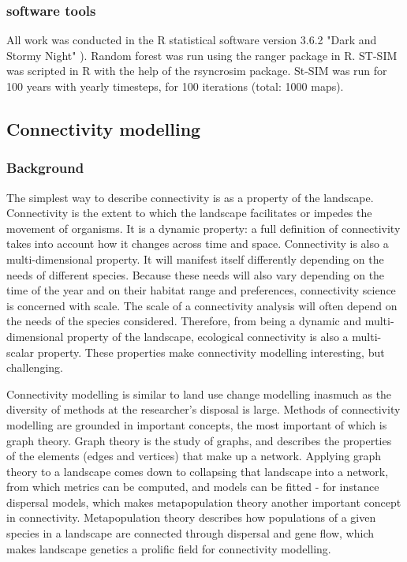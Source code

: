 \subsubsection{software tools}
All work was conducted in the R statistical software version 3.6.2 "Dark and Stormy Night" \citep[see][]{R}). Random forest was run using the ranger package in R. ST-SIM was scripted in R with the help of the rsyncrosim package. St-SIM was run for 100 years with yearly timesteps, for 100 iterations (total: 1000 maps).\\

\subsection{Connectivity modelling}

\subsubsection{Background}
The simplest way to describe connectivity is as a property of the landscape. Connectivity is the extent to which the landscape facilitates or impedes the movement of organisms. It is a dynamic property: a full definition of connectivity takes into account how it changes across time and space. Connectivity is also a multi-dimensional property. It will manifest itself differently depending on the needs of different species. Because these needs will also vary depending on the time of the year and on their habitat range and preferences, connectivity science is concerned with scale. The scale of a connectivity analysis will often depend on the needs of the species considered. Therefore, from being a dynamic and multi-dimensional property of the landscape, ecological connectivity is also a multi-scalar property. These properties make connectivity modelling interesting, but challenging.

Connectivity modelling is similar to land use change modelling inasmuch as the diversity of methods at the researcher’s disposal is large.  Methods of connectivity modelling are grounded in important concepts, the most important of which is graph theory. Graph theory is the study of graphs, and describes the properties of the elements (edges and vertices) that make up a network. Applying graph theory to a landscape comes down to collapsing that landscape into a network, from which metrics can be computed, and models can be fitted - for instance dispersal models, which makes metapopulation theory another important concept in connectivity. Metapopulation theory describes how populations of a given species in a landscape are connected through dispersal and gene flow, which makes landscape genetics a prolific field for connectivity modelling.

